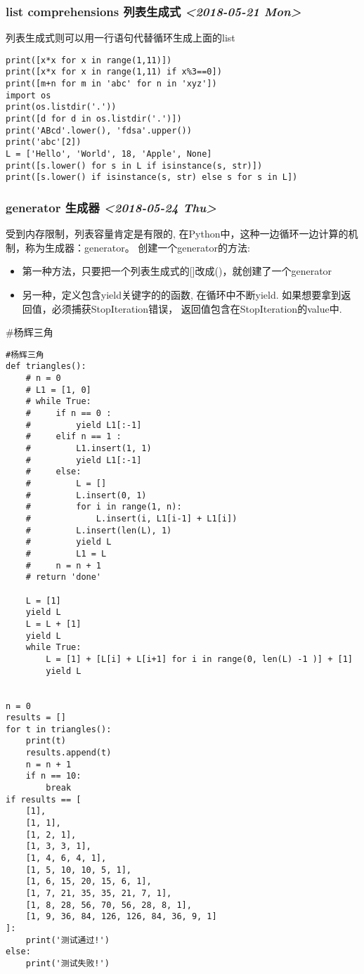 \documentclass[11pt]{article}
\begin{document}
\subsubsection{list comprehensions 列表生成式 \textit{<2018-05-21 Mon>}}
\label{sec:org6967a6c}
列表生成式则可以用一行语句代替循环生成上面的list
\begin{verbatim}
print([x*x for x in range(1,11)])
print([x*x for x in range(1,11) if x%3==0])
print([m+n for m in 'abc' for n in 'xyz'])
import os
print(os.listdir('.'))
print([d for d in os.listdir('.')])
print('ABcd'.lower(), 'fdsa'.upper())
print('abc'[2])
L = ['Hello', 'World', 18, 'Apple', None]
print([s.lower() for s in L if isinstance(s, str)])
print([s.lower() if isinstance(s, str) else s for s in L])
\end{verbatim}

\subsubsection{generator 生成器 \textit{<2018-05-24 Thu>}}
\label{sec:org214c9ac}
受到内存限制，列表容量肯定是有限的,
在Python中，这种一边循环一边计算的机制，称为生成器：generator。
创建一个generator的方法:
\begin{itemize}
\item 第一种方法，只要把一个列表生成式的[]改成()，就创建了一个generator
\item 另一种，定义包含yield关键字的的函数, 在循环中不断yield.
如果想要拿到返回值，必须捕获StopIteration错误，
返回值包含在StopIteration的value中.
\end{itemize}
\#杨辉三角
\begin{verbatim}
#杨辉三角
def triangles():
    # n = 0
    # L1 = [1, 0]
    # while True:
    #     if n == 0 :
    #         yield L1[:-1]
    #     elif n == 1 :
    #         L1.insert(1, 1)
    #         yield L1[:-1]
    #     else:
    #         L = []
    #         L.insert(0, 1)
    #         for i in range(1, n):
    #             L.insert(i, L1[i-1] + L1[i])
    #         L.insert(len(L), 1)
    #         yield L
    #         L1 = L
    #     n = n + 1
    # return 'done'

    L = [1]
    yield L
    L = L + [1]
    yield L
    while True:
        L = [1] + [L[i] + L[i+1] for i in range(0, len(L) -1 )] + [1]
        yield L


n = 0
results = []
for t in triangles():
    print(t)
    results.append(t)
    n = n + 1
    if n == 10:
        break
if results == [
    [1],
    [1, 1],
    [1, 2, 1],
    [1, 3, 3, 1],
    [1, 4, 6, 4, 1],
    [1, 5, 10, 10, 5, 1],
    [1, 6, 15, 20, 15, 6, 1],
    [1, 7, 21, 35, 35, 21, 7, 1],
    [1, 8, 28, 56, 70, 56, 28, 8, 1],
    [1, 9, 36, 84, 126, 126, 84, 36, 9, 1]
]:
    print('测试通过!')
else:
    print('测试失败!')
\end{verbatim}
\end{document}
